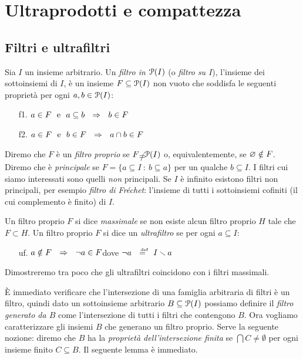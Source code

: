 \chapter{Ultraprodotti e compattezza}\label{ultraprodotti}

\section{Filtri e ultrafiltri}\label{ultrafiltri}

Sia $I$ un insieme arbitrario. Un \emph{filtro in $\P(I)$\/} (o \emph{filtro su $I$}), l'insieme dei sottoinsiemi di $I$, \`e un insieme $F\subseteq \P(I)$ non vuoto che soddisfa le seguenti propriet\`a per ogni  $a, b\in \P(I)$:
\begin{itemize}
\item[f1.] $a\in F\ \ \textrm{e}\ \ a\subseteq b\ \ \IMP\ \ b\in F$
\item[f2.] $a\in F\ \ \textrm{e}\ \ b\in F\ \ \IMP\ \ a\cap b\in F$
\end{itemize}
Diremo che $F$ \`e un \emph{filtro proprio\/} se $F\neq\P(I)$ o, equivalentemente, se $\0\notin F$. Diremo che \`e \emph{principale\/} se $F=\{a\subseteq I\ :\ b\subseteq a\}$ per un qualche $b\subseteq I$. I filtri cui siamo interessati sono quelli \emph{non\/} principali.  Se $I$ \`e infinito esistono filtri non principali, per esempio \emph{filtro di Fr\'echet}: l'insieme di tutti i sottoinsiemi cofiniti (il cui complemento \`e finito) di $I$. 

Un filtro proprio $F$ si dice \emph{massimale\/} se non esiste alcun filtro proprio $H$ tale che $F\subset H$. Un filtro proprio $F$ si dice un \emph{ultrafiltro\/} se per ogni $a\subseteq I$:

\def\ceq#1#2#3{\hspace*{10ex}\llap{#1}\parbox{6ex}{\hfil#2}{#3}}

\begin{itemize}
\item[uf.] $a\notin F\ \ \IMP\ \ \neg a\in F$\hfill dove $\neg a\ \ \deq\ \ I\sm a$
\end{itemize}

Dimostreremo tra poco che gli ultrafiltri coincidono con i filtri massimali.

\`E immediato verificare che l'intersezione di una famiglia arbitraria di filtri \`e un filtro, quindi dato un sottoinsieme arbitrario $B\subseteq\P(I)$ possiamo definire il \emph{filtro generato da $B$\/} come l'intersezione di tutti i filtri che contengono $B$. Ora vogliamo caratterizzare gli insiemi $B$ che generano un filtro proprio. Serve la seguente nozione: diremo che $B$ ha la \emph{propriet\`a dell'intersezione finita\/} se $\bigcap C\neq\emptyset$ per ogni insieme finito $C\subseteq B$. Il seguente lemma \`e immediato.

